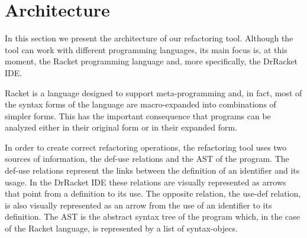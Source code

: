 \section{Architecture}


In this section we present the architecture of our refactoring tool.
Although the tool can work with different programming languages, its
main focus is, at this moment, the Racket programming language and,
more specifically, the DrRacket IDE.

Racket is a language designed to support meta-programming and, in
fact, most of the syntax forms of the language are macro-expanded into
combinations of simpler forms.  This has the important consequence
that programs can be analyzed either in their original form or in
their expanded form.

In order to create correct refactoring operations, the refactoring
tool uses two sources of information, the def-use relations and the
AST of the program.  The def-use relations represent the links between the
definition of an identifier and its usage.  In the DrRacket IDE these
relations are visually represented as arrows that point from a
definition to its use.  The opposite relation, the use-def relation, is
also visually represented as an arrow from the use of an identifier to
its definition.  The AST is the abstract syntax tree of the program
which, in the case of the Racket language, is represented by a list of
syntax-objecs.  %




